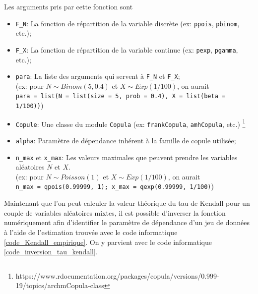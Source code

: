 \documentclass{article}
\begin{document}
 	Les arguments pris par cette fonction sont
 	\begin{itemize}
 		\item \texttt{F\_N}: La fonction de répartition de la variable discrète (ex: \texttt{ppois}, \texttt{pbinom}, etc.);
 		\item \texttt{F\_X}: La fonction de répartition de la variable continue (ex: \texttt{pexp}, \texttt{pgamma}, etc.);
 		\item \texttt{para}: La liste des arguments qui servent à \texttt{F\_N} et \texttt{F\_X}; \\
 			(ex: pour $N\sim Binom(5, 0.4)$ et $X\sim Exp(1/100)$, on aurait \\ 
 			\texttt{para = list(N = list(size = 5, prob = 0.4), X = list(beta = 1/100))})
		\item \texttt{Copule}: Une classe du module \texttt{Copula} (ex: \texttt{frankCopula}, \texttt{amhCopula}, etc.) 
			\footnote{https://www.rdocumentation.org/packages/copula/versions/0.999-19/topics/archmCopula-class}
		\item \texttt{alpha}: Paramètre de dépendance inhérent à la famille de copule utilisée;
		\item \texttt{n\_max} et \texttt{x\_max}: Les valeurs maximales que peuvent prendre les variables aléatoires $N$ et $X$. \\
			(ex: pour $N\sim Poisson(1)$ et $X\sim Exp(1/100)$, on aurait \\ 
			\texttt{n\_max = qpois(0.99999, 1); x\_max = qexp(0.99999, 1/100)})\\
 	\end{itemize}
 
 	Maintenant que l'on peut calculer la valeur théorique du tau de Kendall pour un couple de variables aléatoires mixtes, il est possible d'inverser la fonction numériquement afin d'identifier le paramètre de dépendance d'un jeu de données à l'aide de l'estimation trouvée avec le code informatique \ref{code_Kendall_empirique}. On y parvient avec le code informatique \ref{code_inversion_tau_kendall}.
 	
\end{document}
